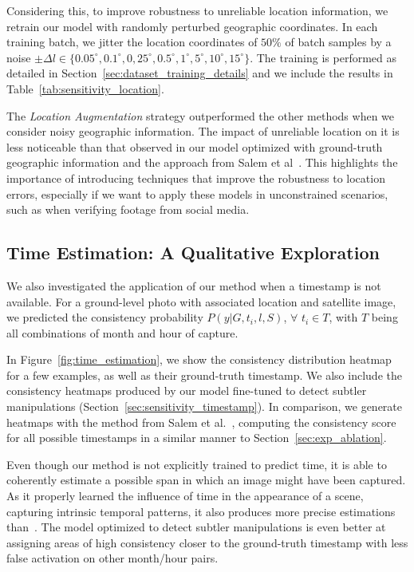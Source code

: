 \documentclass[journal]{IEEEtran}
\begin{document}
        Considering this, to improve robustness to unreliable location information, we retrain our model with randomly perturbed geographic coordinates. In each training batch, we jitter the location coordinates of $50\%$ of batch samples by a noise $\pm\Delta l \in \{0.05^{\circ}, 0.1^{\circ}, 0,25^{\circ}, 0.5^{\circ}, 1^{\circ}, 5^{\circ}, 10^{\circ}, 15^{\circ}\}$. The training is performed as detailed in Section~\ref{sec:dataset_training_details} and we include the results in Table~\ref{tab:sensitivity_location}.
        
        The \textit{Location Augmentation} strategy outperformed the other methods when we consider noisy geographic information. The impact of unreliable location on it is less noticeable than that observed in our model optimized with ground-truth geographic information and the approach from Salem et al~\cite{salem2020learning}. This highlights the importance of introducing techniques that improve the robustness to location errors, especially if we want to apply these models in unconstrained scenarios, such as when verifying footage from social media. 


        
        
    
    \subsection{Time Estimation: A Qualitative Exploration}\label{sec:time_estimation}
        We also investigated the application of our method when a timestamp is not available. For a ground-level photo with associated location and satellite image, we predicted the consistency probability $P(y | G, t_{i}, l, S)$, $\forall$ $t_{i} \in T$, with $T$ being all combinations of month and hour of capture. 
        
        In Figure~\ref{fig:time_estimation}, we show the consistency distribution heatmap for a few examples, as well as their ground-truth timestamp. We also include the consistency heatmaps produced by our model fine-tuned to detect subtler manipulations (Section~\ref{sec:sensitivity_timestamp}). In comparison, we generate heatmaps with the method from Salem et al.~\cite{salem2020learning}, computing the consistency score for all possible timestamps in a similar manner to Section~\ref{sec:exp_ablation}. 
        
        Even though our method is not explicitly trained to predict time, it is able to coherently estimate a possible span in which an image might have been captured. As it properly learned the influence of time in the appearance of a scene, capturing intrinsic temporal patterns, it also produces more precise estimations than~\cite{salem2020learning}. The model optimized to detect subtler manipulations is even better at assigning areas of high consistency closer to the ground-truth timestamp with less false activation on other month/hour pairs.
        
\end{document}

